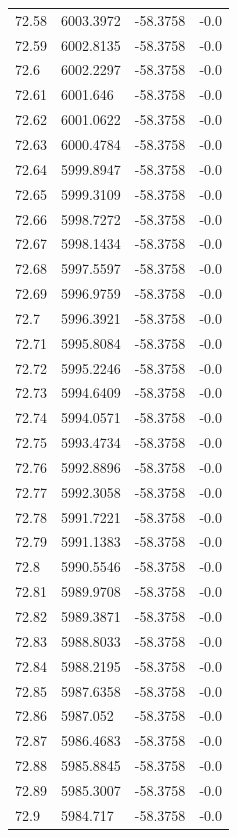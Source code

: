 \begin{table}[H]
\begin{tabular}{llll}
72.58 & 6003.3972 & -58.3758 & -0.0 \\
72.59 & 6002.8135 & -58.3758 & -0.0 \\
72.6 & 6002.2297 & -58.3758 & -0.0 \\
72.61 & 6001.646 & -58.3758 & -0.0 \\
72.62 & 6001.0622 & -58.3758 & -0.0 \\
72.63 & 6000.4784 & -58.3758 & -0.0 \\
72.64 & 5999.8947 & -58.3758 & -0.0 \\
72.65 & 5999.3109 & -58.3758 & -0.0 \\
72.66 & 5998.7272 & -58.3758 & -0.0 \\
72.67 & 5998.1434 & -58.3758 & -0.0 \\
72.68 & 5997.5597 & -58.3758 & -0.0 \\
72.69 & 5996.9759 & -58.3758 & -0.0 \\
72.7 & 5996.3921 & -58.3758 & -0.0 \\
72.71 & 5995.8084 & -58.3758 & -0.0 \\
72.72 & 5995.2246 & -58.3758 & -0.0 \\
72.73 & 5994.6409 & -58.3758 & -0.0 \\
72.74 & 5994.0571 & -58.3758 & -0.0 \\
72.75 & 5993.4734 & -58.3758 & -0.0 \\
72.76 & 5992.8896 & -58.3758 & -0.0 \\
72.77 & 5992.3058 & -58.3758 & -0.0 \\
72.78 & 5991.7221 & -58.3758 & -0.0 \\
72.79 & 5991.1383 & -58.3758 & -0.0 \\
72.8 & 5990.5546 & -58.3758 & -0.0 \\
72.81 & 5989.9708 & -58.3758 & -0.0 \\
72.82 & 5989.3871 & -58.3758 & -0.0 \\
72.83 & 5988.8033 & -58.3758 & -0.0 \\
72.84 & 5988.2195 & -58.3758 & -0.0 \\
72.85 & 5987.6358 & -58.3758 & -0.0 \\
72.86 & 5987.052 & -58.3758 & -0.0 \\
72.87 & 5986.4683 & -58.3758 & -0.0 \\
72.88 & 5985.8845 & -58.3758 & -0.0 \\
72.89 & 5985.3007 & -58.3758 & -0.0 \\
72.9 & 5984.717 & -58.3758 & -0.0 \\

\end{tabular}
\end{table}
